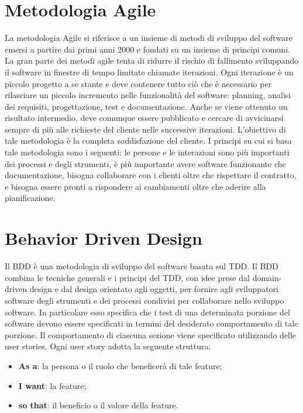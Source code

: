 \section{Metodologia Agile}
La metodologia Agile si riferisce a un insieme di metodi di sviluppo del software emersi a partire dai primi anni 2000 e fondati su un insieme di principi comuni. La gran parte dei metodi agile tenta di ridurre il rischio di fallimento sviluppando il software in finestre di tempo limitate chiamate iterazioni. Ogni iterazione è un piccolo progetto a se stante e deve contenere tutto ciò che è necessario per rilasciare un piccolo incremento nelle funzionalità del software: planning, analisi dei requisiti, progettazione, test e documentazione. Anche se viene ottenuto un risultato intermedio, deve comunque essere pubblicato e cercare di avvicinarsi sempre di più alle richieste del cliente nelle successive iterazioni. L'obiettivo di tale metodologia è la completa soddisfazione del cliente. I principi su cui si basa tale metodologia sono i seguenti: le persone e le interazioni sono più importanti dei processi e degli strumenti, è più importante avere software funzionante che documentazione, bisogna collaborare con i clienti oltre che rispettare il contratto, e bisogna essere pronti a rispondere ai cambiamenti oltre che aderire alla pianificazione.

\section{Behavior Driven Design}
Il BDD è una metodologia di sviluppo del software basata sul TDD. Il BDD combina le tecniche generali e i principi del TDD, con idee prese dal domain-driven design e dal design orientato agli oggetti, per fornire agli sviluppatori software degli strumenti e dei processi condivisi per collaborare nello sviluppo software. In particolare esso specifica che i test di una determinata porzione del software devono essere specificati in termini del desiderato comportamento di tale porzione. Il comportamento di ciascuna sezione viene specificato utilizzando delle user stories. Ogni user story adotta la seguente struttura:
\begin{itemize}
    \item \textbf{As a}: la persona o il ruolo che beneficerà di tale feature;
    \item \textbf{I want}: la feature;
    \item \textbf{so that}: il beneficio o il valore della feature.
\end{itemize}
